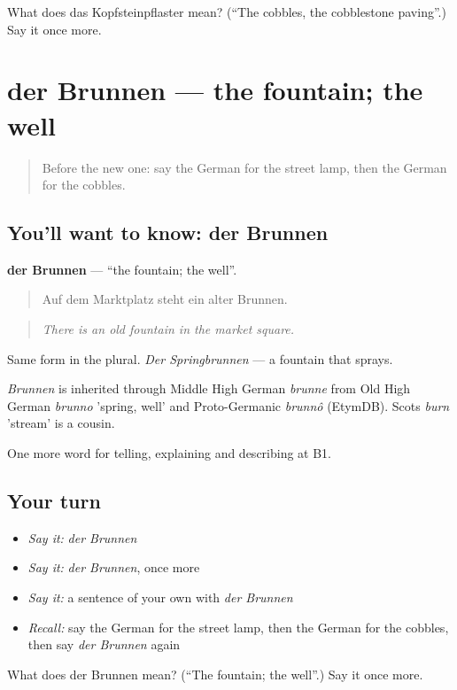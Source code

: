 \begin{tcolorbox}[breakable,colback=teal!4,colframe=teal!35!black,title={Before you move on}]
What does das Kopfsteinpflaster mean? (\textquotedblleft{}The cobbles, the cobblestone paving\textquotedblright{}.) Say it once more.
\end{tcolorbox}
\section[der Brunnen]{der Brunnen — the fountain; the well}

\label{lesson:GE-C440-brunnen}



\begin{quote}
Before the new one: say the German for the street lamp, then the German for the cobbles.
\end{quote}

\subsection*{You'll want to know: der Brunnen}
\textbf{der Brunnen} — \textquotedblleft{}the fountain; the well\textquotedblright{}.

\begin{quote}
Auf dem Marktplatz steht ein alter Brunnen.
\end{quote}

\begin{quote}
\emph{There is an old fountain in the market square.}
\end{quote}

Same form in the plural. \emph{Der Springbrunnen} — a fountain that sprays.

\begin{cousinweb}
\emph{Brunnen} is inherited through Middle High German \emph{brunne} from Old High German \emph{brunno} 'spring, well' and Proto-Germanic \emph{brunnô} (EtymDB). Scots \emph{burn} 'stream' is a cousin.
\end{cousinweb}

\begin{grammarlens}[title={What you've built}]
One more word for telling, explaining and describing at B1.
\end{grammarlens}

\subsection*{Your turn}
\begin{itemize}
\raggedright
  \item \emph{Say it:} \emph{der Brunnen}
  \item \emph{Say it:} \emph{der Brunnen}, once more
  \item \emph{Say it:} a sentence of your own with \emph{der Brunnen}
  \item \emph{Recall:} say the German for the street lamp, then the German for the cobbles, then say \emph{der Brunnen} again
\end{itemize}

\begin{tcolorbox}[breakable,colback=teal!4,colframe=teal!35!black,title={Before you move on}]
What does der Brunnen mean? (\textquotedblleft{}The fountain; the well\textquotedblright{}.) Say it once more.
\end{tcolorbox}
